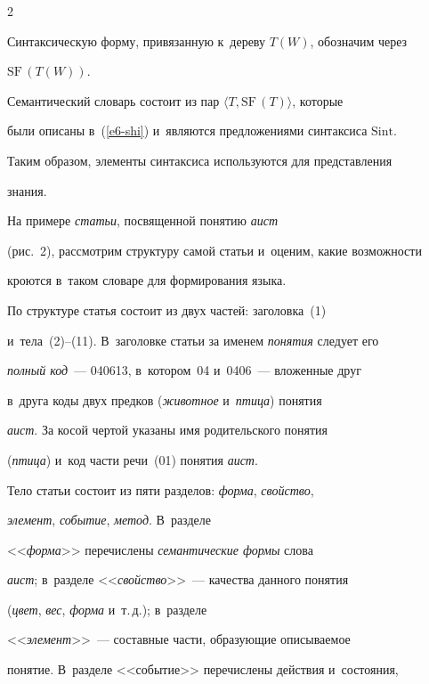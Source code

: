 \begin{multicols}{2}
     

     Синтаксическую форму, привязанную к~дереву $T(W)$, обозначим через 

     $\mathrm{SF}\,(T(W))$. 

Семантический словарь состоит из пар $\langle T, \mathrm{SF}\,(T)\rangle$, которые 

были описаны в~(\ref{e6-shi}) и~являются предложениями синтаксиса $\mathrm{Sint}$. 

Таким образом, элементы синтаксиса используются для представления 

знания.

     

     На примере \textit{статьи}, посвященной понятию \textit{аист} 

(рис.~2), рассмотрим структуру самой \mbox{статьи} и~оценим, какие возможности 

кроются в~таком словаре для формирования языка.

     



     

     По структуре статья состоит из двух частей: заголовка~(1)  

и~тела~(2)--(11). В~заголовке статьи за именем \textit{понятия} следует его 

\textit{полный код}~--- 040613, в~котором~04 и~0406~--- вложенные друг 

в~друга коды двух предков (\textit{животное} и~\textit{птица}) понятия 

\textit{аист}. За косой чертой указаны имя родительского понятия 

(\textit{птица}) и~код части речи~(01) понятия \textit{аист}.

     

     Тело статьи состоит из пяти разделов: \textit{форма}, \textit{свойство}, 

\textit{элемент}, \textit{событие}, \textit{метод}. В~разделе 

<<\textit{форма}>> перечислены \textit{семантические формы} слова 

\textit{аист}; в~разделе <<\textit{свойство}>>~--- качества данного понятия 

(\textit{цвет}, \textit{вес}, \textit{форма} и~т.\,д.); в~разделе 

<<\textit{элемент}>>~--- составные части, образующие описываемое 

понятие. В~разделе <<событие>> перечислены действия и~состояния, 


\end{multicols}
